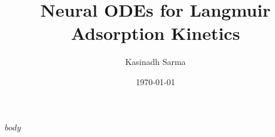 \documentclass[12pt]{article}
\title{Neural ODEs for Langmuir Adsorption Kinetics}
\author{Kasinadh Sarma}
\date{\today}
\begin{document}
$body$
\end{document}
